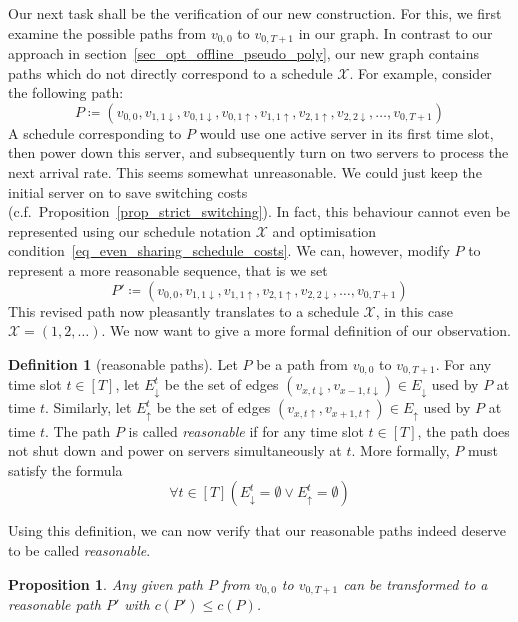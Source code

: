 \documentclass[hidelinks]{article}
\theoremstyle{plain}
\newtheorem{prop}[thm]{Proposition}
\theoremstyle{definition}
\newtheorem{defn}[thm]{Definition}
\theoremstyle{rem}
\newcommand{\mx}{\mathcal{X}}
\newcommand{\costs}{c}
\begin{document}
Our next task shall be the verification of our new construction. For this, we first examine the possible paths from $v_{0,0}$ to $v_{0,T+1}$ in our graph.
In contrast to our approach in section~\ref{sec_opt_offline_pseudo_poly}, our new graph contains paths which do not directly correspond to a schedule $\mx$. For example, consider the following path:
\begin{equation*}
	P\coloneqq(v_{0,0},v_{1,1\downarrow},v_{0,1\downarrow},v_{0,1\uparrow},v_{1,1\uparrow},v_{2,1\uparrow},v_{2,2\downarrow},\ldots,v_{0,T+1})
\end{equation*}
A schedule corresponding to $P$ would use one active server in its first time slot, then power down this server, and subsequently turn on two servers to process the next arrival rate. This seems somewhat unreasonable. We could just keep the initial server on to save switching costs (c.f.\ Proposition~\ref{prop_strict_switching}). In fact, this behaviour cannot even be represented using our schedule notation $\mx$ and optimisation condition~\eqref{eq_even_sharing_schedule_costs}. We can, however, modify $P$ to represent a more reasonable sequence, that is we set
\begin{equation*}
	P'\coloneqq(v_{0,0},v_{1,1\downarrow},v_{1,1\uparrow},v_{2,1\uparrow},v_{2,2\downarrow},\ldots,v_{0,T+1})
\end{equation*}
This revised path now pleasantly translates to a schedule $\mx$, in this case $\mx=(1,2,\ldots)$. We now want to give a more formal definition of our observation.
\begin{defn}[reasonable paths]\label{defn_reasn_paths}
Let $P$ be a path from $v_{0,0}$ to $v_{0,T+1}$. For any time slot $t\in[T]$, let $E_\downarrow^t$ be the set of edges $(v_{x,t\downarrow},v_{x-1,t\downarrow})\in E_\downarrow$ used by $P$ at time $t$. Similarly, let $E_\uparrow^t$ be the set of edges $(v_{x,t\uparrow},v_{x+1,t\uparrow})\in E_\uparrow$ used by $P$ at time $t$.
The path $P$ is called \textit{reasonable} if for any time slot $t\in[T]$, the path does not shut down and power on servers simultaneously at $t$. More formally, $P$ must satisfy the formula
\begin{equation}
	\forall t\in[T]\left(E_\downarrow^t=\emptyset \lor E_\uparrow^t=\emptyset\right)\label{eq_reasn_path}
\end{equation}
\end{defn}
Using this definition, we can now verify that our reasonable paths indeed deserve to be called \textit{reasonable}.
\begin{prop}\label{prop_path_to_reasn_path}
Any given path $P$ from $v_{0,0}$ to $v_{0,T+1}$ can be transformed to a reasonable path $P'$ with $\costs(P')\le\costs(P)$.
\end{prop}
\end{document}
